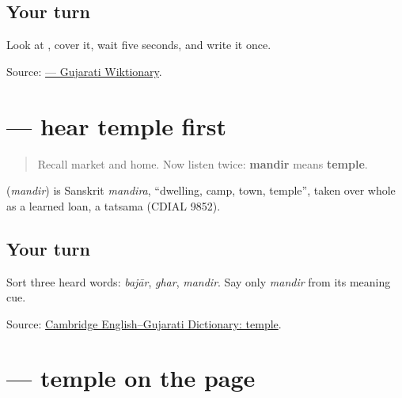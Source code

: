 \subsection*{Your turn}

Look at \textbf{}, cover it, wait five seconds, and write it once.

\begin{tcolorbox}[breakable,colback=teal!4,colframe=teal!35!black,title={Before you move on}]
Source: \href{https://gu.wiktionary.org/wiki/\%E0\%AA\%98\%E0\%AA\%B0}{ — Gujarati Wiktionary}.
\end{tcolorbox}
\section[\texorpdfstring{\gu{મંદિર} (mandir)}{મંદિર (mandir)}]{ — hear temple first}

\label{lesson:GU-C20-hear-mandir}



\begin{quote}
Recall market and home. Now listen twice: \textbf{mandir} means \textbf{temple}.
\end{quote}

\begin{cousinweb}
\textbf{} (\emph{mandir}) is Sanskrit \emph{mandira}, \textquotedblleft{}dwelling, camp, town, temple\textquotedblright{}, taken over whole as a learned loan, a tatsama (CDIAL 9852).
\end{cousinweb}

\subsection*{Your turn}
Sort three heard words: \emph{bajār}, \emph{ghar}, \emph{mandir}. Say only \emph{mandir} from its meaning cue.

\begin{tcolorbox}[breakable,colback=teal!4,colframe=teal!35!black,title={Before you move on}]
Source: \href{https://dictionary.cambridge.org/dictionary/english-gujarati/temple}{Cambridge English–Gujarati Dictionary: temple}.
\end{tcolorbox}
\section[\texorpdfstring{\gu{મંદિર} (mandir)}{મંદિર (mandir)}]{ — temple on the page}


